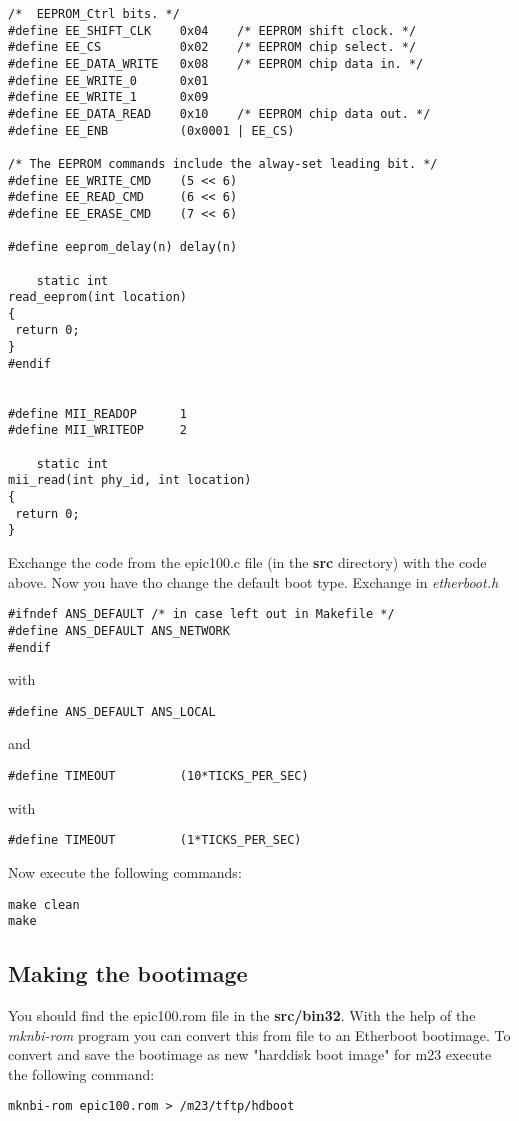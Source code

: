 \begin{verbatim}
/*  EEPROM_Ctrl bits. */
#define EE_SHIFT_CLK    0x04    /* EEPROM shift clock. */
#define EE_CS           0x02    /* EEPROM chip select. */
#define EE_DATA_WRITE   0x08    /* EEPROM chip data in. */
#define EE_WRITE_0      0x01
#define EE_WRITE_1      0x09
#define EE_DATA_READ    0x10    /* EEPROM chip data out. */
#define EE_ENB          (0x0001 | EE_CS)

/* The EEPROM commands include the alway-set leading bit. */
#define EE_WRITE_CMD    (5 << 6)
#define EE_READ_CMD     (6 << 6)
#define EE_ERASE_CMD    (7 << 6)

#define eeprom_delay(n) delay(n)

    static int
read_eeprom(int location)
{
 return 0;
}
#endif


#define MII_READOP      1
#define MII_WRITEOP     2

    static int
mii_read(int phy_id, int location)
{
 return 0;
}
\end{verbatim}

Exchange the code from the epic100.c file (in the \textbf{src} directory) with the code above. Now you have tho change the default boot type. Exchange in \textit{etherboot.h} 
\begin{verbatim}
#ifndef	ANS_DEFAULT	/* in case left out in Makefile */
#define	ANS_DEFAULT	ANS_NETWORK
#endif
\end{verbatim} 
with
\begin{verbatim}
#define	ANS_DEFAULT ANS_LOCAL
\end{verbatim} 
and
\begin{verbatim}
#define TIMEOUT			(10*TICKS_PER_SEC)
\end{verbatim} 
with
\begin{verbatim}
#define TIMEOUT			(1*TICKS_PER_SEC)
\end{verbatim} 

 Now execute the following commands:\\
\begin{verbatim}
make clean
make
\end{verbatim}

\subsection{Making the bootimage}
You should find the epic100.rom file in the \textbf{src/bin32}. With the help of the \textit{mknbi-rom} program you can convert this from file to an Etherboot bootimage. To convert and save the bootimage as new "harddisk boot image" for m23 execute the following command:\\
\begin{verbatim}
mknbi-rom epic100.rom > /m23/tftp/hdboot
\end{verbatim}